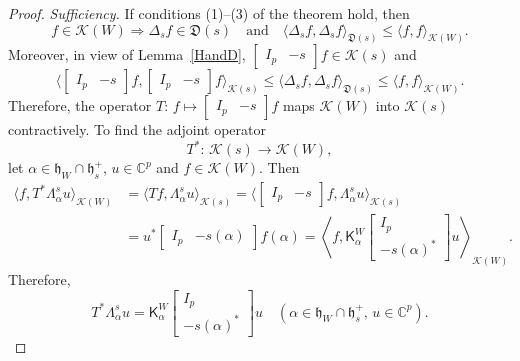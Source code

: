 \documentclass[12pt,twoside,a4paper]{amsart}
\theoremstyle{definition}
\numberwithin{equation}{section}
\begin{document}
\begin{proof}
{\it Sufficiency.} If conditions (1)--(3) of the theorem hold, then
\begin{equation}
    \label{IneqDK}
f\in{{\mathcal K}}(W)\Longrightarrow\Delta_sf\in{{\mathfrak D}}(s)\quad\text{and}\quad
\langle\Delta_sf,\Delta_sf\rangle_{{{\mathfrak D}}(s)}\le \langle
f,f\rangle_{{{\mathcal K}}(W)}.
\end{equation}
Moreover, in view of Lemma~\ref{HandD}, $\begin{bmatrix} I_p &
-s\end{bmatrix} f\in{{\mathcal K}}(s)$ and
\begin{equation}
    \label{IneqKsW}
\langle \begin{bmatrix} I_p & -s
\end{bmatrix}f,\begin{bmatrix}
I_p & -s
\end{bmatrix}f\rangle_{{{\mathcal K}}(s)}\le \langle\Delta_sf,\Delta_sf\rangle_{{{\mathfrak D}}(s)}\le
\langle f,f\rangle_{{{\mathcal K}}(W)}.
\end{equation}
Therefore, the operator $T:\, f\mapsto \begin{bmatrix} I_p & -s
\end{bmatrix}f$ maps ${{\mathcal K}}(W)$ into ${{\mathcal K}}(s)$ contractively.
To find the adjoint operator
\[
T^*:\, {{\mathcal K}}(s)\to{{\mathcal K}}(W),
\]
let $\alpha\in{{\mathfrak h}}_W\cap{{\mathfrak h}}_s^+$, $u\in{{\mathbb C}}^p$ and $f\in{{\mathcal K}}(W)$. Then
\[
\begin{split}
\langle f,T^*{\mathsf \Lambda}^s_\alpha u\rangle_{{{\mathcal K}}(W)} &=\langle
Tf,{\mathsf \Lambda}^s_\alpha u\rangle_{{{\mathcal K}}(s)} =\langle
\begin{bmatrix} I_p & -s
\end{bmatrix}f,{\mathsf \Lambda}^s_\alpha u\rangle_{{{\mathcal K}}(s)}\\
&=u^*\begin{bmatrix} I_p & -s(\alpha)
\end{bmatrix}f(\alpha)=\left\langle f,{\mathsf K}_{\alpha}^W\begin{bmatrix}
  I_p \\
  -s(\alpha)^*
\end{bmatrix} u\right\rangle_{{{\mathcal K}}(W)}.
\end{split}
\]
Therefore,
\begin{equation}\label{eq:2.270}
 T^*{\mathsf \Lambda}^s_\alpha u={\mathsf K}_{\alpha}^W\begin{bmatrix}
  I_p \\
  -s(\alpha)^*
\end{bmatrix} u\quad(\alpha\in{{\mathfrak h}}_W\cap {{\mathfrak h}}_s^+,\,u\in{{\mathbb C}}^p).
\end{equation}


\end{proof}
\end{document}
